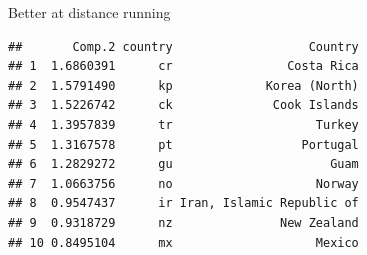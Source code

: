 \documentclass[ignorenonframetext,]{beamer}
\newenvironment{Shaded}{\begin{snugshade}}{\end{snugshade}}
\newcommand{\DataTypeTok}[1]{\textcolor[rgb]{0.13,0.29,0.53}{#1}}
\newcommand{\DecValTok}[1]{\textcolor[rgb]{0.00,0.00,0.81}{#1}}
\newcommand{\FloatTok}[1]{\textcolor[rgb]{0.00,0.00,0.81}{#1}}
\newcommand{\KeywordTok}[1]{\textcolor[rgb]{0.13,0.29,0.53}{\textbf{#1}}}
\newcommand{\NormalTok}[1]{#1}
\newcommand{\OperatorTok}[1]{\textcolor[rgb]{0.81,0.36,0.00}{\textbf{#1}}}
\newcommand{\StringTok}[1]{\textcolor[rgb]{0.31,0.60,0.02}{#1}}
\begin{document}
\begin{frame}[fragile]{Better at distance running}
\protect\hypertarget{better-at-distance-running}{}

\footnotesize

\begin{Shaded}
\end{Shaded}

\begin{verbatim}
##       Comp.2 country                   Country
## 1  1.6860391      cr                Costa Rica
## 2  1.5791490      kp             Korea (North)
## 3  1.5226742      ck              Cook Islands
## 4  1.3957839      tr                    Turkey
## 5  1.3167578      pt                  Portugal
## 6  1.2829272      gu                      Guam
## 7  1.0663756      no                    Norway
## 8  0.9547437      ir Iran, Islamic Republic of
## 9  0.9318729      nz               New Zealand
## 10 0.8495104      mx                    Mexico
\end{verbatim}

\normalsize

\end{frame}
\end{document}
